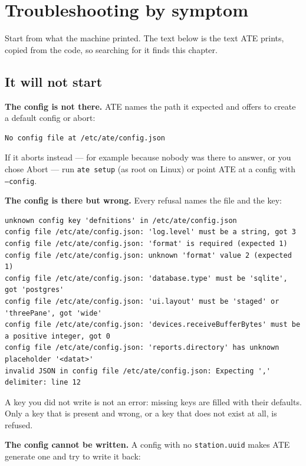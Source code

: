 \chapter{Troubleshooting by symptom}\label{ch:troubleshooting}

Start from what the machine printed. The text below is the text ATE prints, copied from the code,
so searching for it finds this chapter.

\section{It will not start}

\textbf{The config is not there.} ATE names the path it expected and offers to create a default
config or abort:

\begin{lstlisting}[language=ATEShell]
No config file at /etc/ate/config.json
\end{lstlisting}

If it aborts instead --- for example because nobody was there to answer, or you chose Abort --- run
\texttt{ate setup} (as root on Linux) or point ATE at a config with \texttt{--config}.

\textbf{The config is there but wrong.} Every refusal names the file and the key:

\begin{lstlisting}[language=ATEShell]
unknown config key 'defnitions' in /etc/ate/config.json
config file /etc/ate/config.json: 'log.level' must be a string, got 3
config file /etc/ate/config.json: 'format' is required (expected 1)
config file /etc/ate/config.json: unknown 'format' value 2 (expected 1)
config file /etc/ate/config.json: 'database.type' must be 'sqlite', got 'postgres'
config file /etc/ate/config.json: 'ui.layout' must be 'staged' or 'threePane', got 'wide'
config file /etc/ate/config.json: 'devices.receiveBufferBytes' must be a positive integer, got 0
config file /etc/ate/config.json: 'reports.directory' has unknown placeholder '<datat>'
invalid JSON in config file /etc/ate/config.json: Expecting ',' delimiter: line 12
\end{lstlisting}

A key you did not write is not an error: missing keys are filled with their defaults. Only a key
that is present and wrong, or a key that does not exist at all, is refused.

\textbf{The config cannot be written.} A config with no \texttt{station.uuid} makes ATE generate one
and try to write it back:

